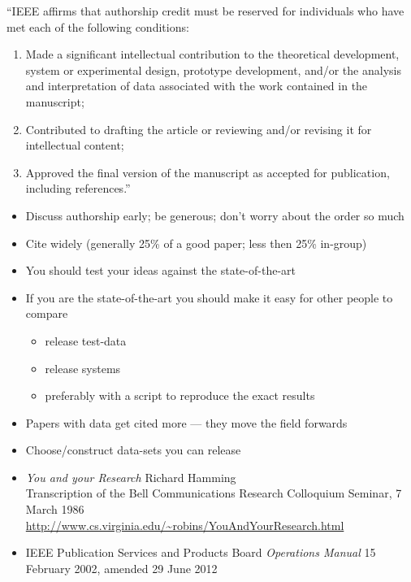 \documentclass[a4paper,landscape,headrule,footrule,dvips]{foils}
\begin{document}
\begin{CJK}{UTF8}{min}

``IEEE affirms that authorship credit must be reserved for individuals
who have met each of the following conditions:

\begin{enumerate}\addtolength{\itemsep}{-2ex}
\item  Made a significant intellectual contribution to the theoretical development, system or experimental design, prototype development, and/or the analysis and interpretation of data associated with the work contained in the manuscript;
\item    Contributed to drafting the article or reviewing and/or revising it for intellectual content;
\item     Approved the final version of the manuscript as accepted for publication, including references.'' 
\end{enumerate}

\begin{itemize}\addtolength{\itemsep}{-1ex}
\item Discuss authorship early; be generous; don't worry about the order so much
\item Cite widely (generally 25\% of a good paper; less then 25\% in-group)
\end{itemize}


\begin{itemize}
\item You should test your ideas against the state-of-the-art
\item If you are the state-of-the-art you should make it easy for
  other people to compare
  \begin{itemize}
  \item release test-data
  \item release systems
  \item preferably with a script to reproduce the exact results
  \end{itemize}
\item Papers with data get cited more --- they move the field forwards
\item Choose/construct data-sets you can release
\end{itemize}




\MyLogo{}
\begin{itemize}

\item 
\textit{You and your Research}  Richard Hamming
\\ Transcription of the Bell Communications Research Colloquium Seminar, 7 March 1986 
\\ \url{http://www.cs.virginia.edu/~robins/YouAndYourResearch.html}
\item IEEE Publication Services and Products Board 
\textit{Operations Manual} 15 February 2002, amended 29 June 2012

\end{itemize}
\clearpage
\end{CJK}
\end{document}
